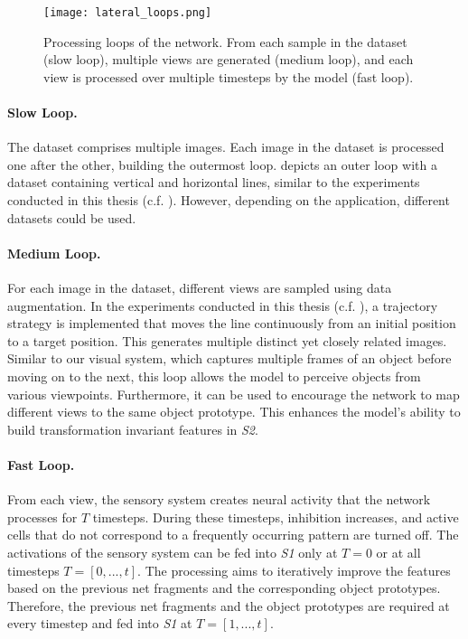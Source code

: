 \begin{figure}[h]
    \centering
    \texttt{[image: lateral\_loops.png]}
    \caption[Processing loops of the network]{Processing loops of the network. From each sample in the dataset (slow loop), multiple views are generated (medium loop), and each view is processed over multiple timesteps by the model (fast loop).}
\end{figure}

\paragraph{Slow Loop.} The dataset comprises multiple images. Each image in the dataset is processed one after the other, building the outermost loop.  depicts an outer loop with a dataset containing vertical and horizontal lines, similar to the experiments conducted in this thesis (c.f. ). However, depending on the application, different datasets could be used.

\paragraph{Medium Loop.} For each image in the dataset, different views are sampled using data augmentation. In the experiments conducted in this thesis (c.f. ), a trajectory strategy is implemented that moves the line continuously from an initial position to a target position. This generates multiple distinct yet closely related images. Similar to our visual system, which captures multiple frames of an object before moving on to the next, this loop allows the model to perceive objects from various viewpoints. Furthermore, it can be used to encourage the network to map different views to the same object prototype. This enhances the model's ability to build transformation invariant features in \emph{S2}.

\paragraph{Fast Loop.} From each view, the sensory system creates neural activity that the network processes for $T$ timesteps. During these timesteps, inhibition increases, and active cells that do not correspond to a frequently occurring pattern are turned off. 
The activations of the sensory system can be fed into \emph{S1} only at $T=0$ or at all timesteps $T=[0, ..., t]$. The processing aims to iteratively improve the features based on the previous net fragments and the corresponding object prototypes. Therefore, the previous net fragments and the object prototypes are required at every timestep and fed into \emph{S1} at $T=[1, ..., t]$.


